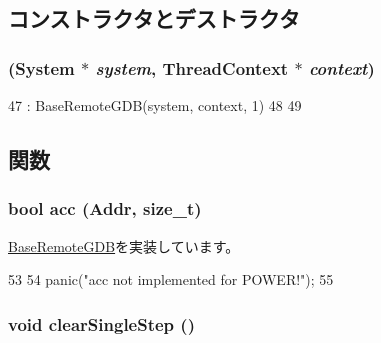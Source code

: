 \subsection{コンストラクタとデストラクタ}
\hypertarget{classPowerISA_1_1RemoteGDB_a7d97c5a4edd8630299b2b0521ae32d98}{
\subsubsection[{RemoteGDB}]{ ({\bf System} $\ast$ {\em system}, \/  {\bf ThreadContext} $\ast$ {\em context})}}
\label{classPowerISA_1_1RemoteGDB_a7d97c5a4edd8630299b2b0521ae32d98}



\begin{DoxyCode}
47         : BaseRemoteGDB(system, context, 1)
48     {
49     }
\end{DoxyCode}


\subsection{関数}
\hypertarget{classPowerISA_1_1RemoteGDB_a07d679884d7893090266b44c9a1520cb}{
\subsubsection[{acc}]{\setlength{\rightskip}{0pt plus 5cm}bool acc ({\bf Addr}, \/  size\_\-t)}}
\label{classPowerISA_1_1RemoteGDB_a07d679884d7893090266b44c9a1520cb}


\hyperlink{classBaseRemoteGDB_ac0968a34e271b194ce3e808a2252d6a3}{BaseRemoteGDB}を実装しています。


\begin{DoxyCode}
53     {
54         panic("acc not implemented for POWER!");
55     }
\end{DoxyCode}
\hypertarget{classPowerISA_1_1RemoteGDB_afd89268069d9026378b06b08c97f65f8}{
\subsubsection[{clearSingleStep}]{\setlength{\rightskip}{0pt plus 5cm}void clearSingleStep ()}}
\label{classPowerISA_1_1RemoteGDB_afd89268069d9026378b06b08c97f65f8}


